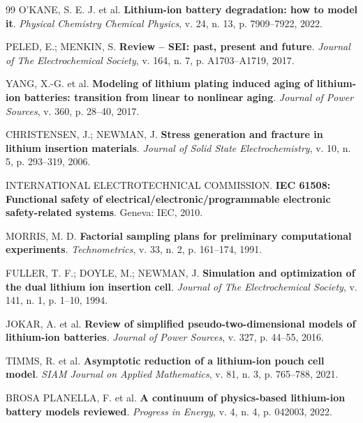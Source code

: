 \documentclass[
    12pt,
    openright,
    twoside,
    a4paper,
    brazil,
    english
]{abntex2}
\begin{document}
\begin{thebibliography}{99}
O'KANE, S. E. J. et al.
\textbf{Lithium-ion battery degradation: how to model it}.
\textit{Physical Chemistry Chemical Physics}, v. 24, n. 13,
p. 7909--7922, 2022.

PELED, E.; MENKIN, S.
\textbf{Review -- SEI: past, present and future}.
\textit{Journal of The Electrochemical Society}, v. 164, n. 7,
p. A1703--A1719, 2017.

YANG, X.-G. et al.
\textbf{Modeling of lithium plating induced aging of lithium-ion batteries:
transition from linear to nonlinear aging}.
\textit{Journal of Power Sources}, v. 360, p. 28--40, 2017.

CHRISTENSEN, J.; NEWMAN, J.
\textbf{Stress generation and fracture in lithium insertion materials}.
\textit{Journal of Solid State Electrochemistry}, v. 10, n. 5,
p. 293--319, 2006.

INTERNATIONAL ELECTROTECHNICAL COMMISSION.
\textbf{IEC 61508: Functional safety of electrical/electronic/programmable
electronic safety-related systems}.
Geneva: IEC, 2010.

MORRIS, M. D.
\textbf{Factorial sampling plans for preliminary computational experiments}.
\textit{Technometrics}, v. 33, n. 2, p. 161--174, 1991.

FULLER, T. F.; DOYLE, M.; NEWMAN, J.
\textbf{Simulation and optimization of the dual lithium ion insertion cell}.
\textit{Journal of The Electrochemical Society}, v. 141, n. 1,
p. 1--10, 1994.

JOKAR, A. et al.
\textbf{Review of simplified pseudo-two-dimensional models of lithium-ion batteries}.
\textit{Journal of Power Sources}, v. 327, p. 44--55, 2016.

TIMMS, R. et al.
\textbf{Asymptotic reduction of a lithium-ion pouch cell model}.
\textit{SIAM Journal on Applied Mathematics}, v. 81, n. 3,
p. 765--788, 2021.

BROSA PLANELLA, F. et al.
\textbf{A continuum of physics-based lithium-ion battery models reviewed}.
\textit{Progress in Energy}, v. 4, n. 4, p. 042003, 2022.

\end{thebibliography}
\end{document}
